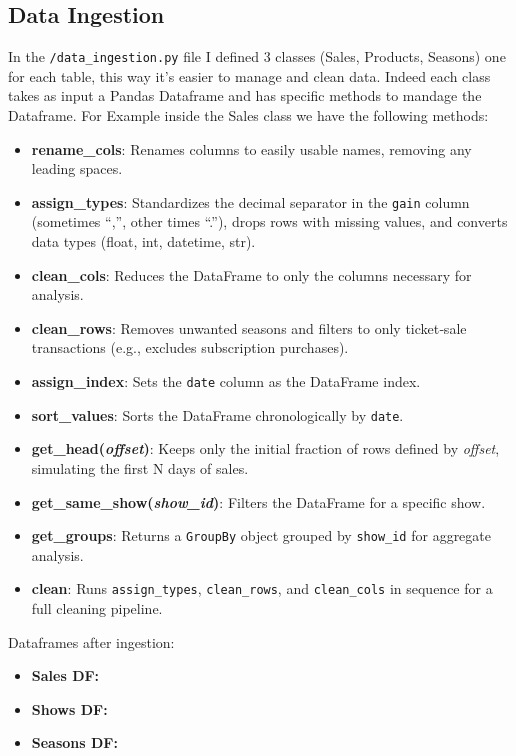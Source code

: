 \documentclass[a4paper,12pt]{report}  %
\begin{document}
  \subsection{Data Ingestion}
      In the \verb|/data_ingestion.py| file I defined 3 classes (Sales, Products, Seasons) one for each table, this way it's easier to manage and clean data.
      Indeed each class takes as input a Pandas Dataframe and has specific methods to mandage the Dataframe. 
      For Example inside the Sales class we have the following methods:
      \begin{itemize}
        \item \textbf{rename\_cols}: Renames columns to easily usable names, removing any leading spaces.
        \item \textbf{assign\_types}: Standardizes the decimal separator in the \texttt{gain} column (sometimes “,”, other times “.”), drops rows with missing values, and converts data types (float, int, datetime, str).
        \item \textbf{clean\_cols}: Reduces the DataFrame to only the columns necessary for analysis.
        \item \textbf{clean\_rows}: Removes unwanted seasons and filters to only ticket‐sale transactions (e.g., excludes subscription purchases).
        \item \textbf{assign\_index}: Sets the \texttt{date} column as the DataFrame index.
        \item \textbf{sort\_values}: Sorts the DataFrame chronologically by \texttt{date}.
        \item \textbf{get\_head(\emph{offset})}: Keeps only the initial fraction of rows defined by \emph{offset}, simulating the first N days of sales.
        \item \textbf{get\_same\_show(\emph{show\_id})}: Filters the DataFrame for a specific show.
        \item \textbf{get\_groups}: Returns a \texttt{GroupBy} object grouped by \texttt{show\_id} for aggregate analysis.
        \item \textbf{clean}: Runs \texttt{assign\_types}, \texttt{clean\_rows}, and \texttt{clean\_cols} in sequence for a full cleaning pipeline.
      \end{itemize}

  Dataframes after ingestion:
    \begin{itemize}
      \item \textbf{Sales DF:}
      \item \textbf{Shows DF:}
      \item \textbf{Seasons DF:}
    \end{itemize}
\end{document}
